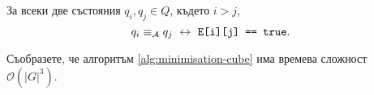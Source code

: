 \begin{theorem}
  За всеки две състояния $q_i,q_j \in Q$, където $i > j$,
  \[q_i \equiv_{\mathcal{A}} q_j \ \leftrightarrow\  \texttt{E[i][j] == true}.\]
\end{theorem}

\begin{problem}
  Съобразете, че алгоритъм \ref{alg:minimisation-cube} има времева сложност $\mathcal{O}(|G|^3)$.
\end{problem}


